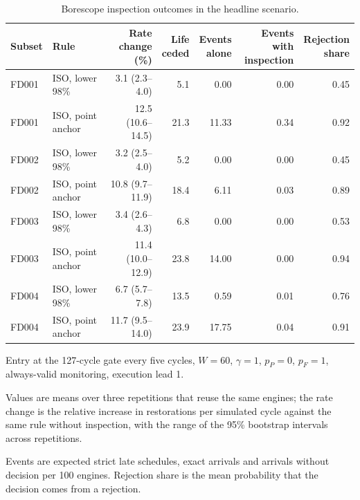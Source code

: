 \documentclass[12pt]{article}
\newcommand{\tablenotes}[1]{\par\smallskip\begin{minipage}{\linewidth}\footnotesize\raggedright\setlength{\parindent}{0pt}#1\end{minipage}}
\begin{document}
\begin{table}[htbp]
\centering
\caption{Borescope inspection outcomes in the headline scenario.}
\label{tab:inspection}
\footnotesize
\setlength{\tabcolsep}{3pt}
\begin{tabularx}{\linewidth}{@{}lXrrrrr@{}}
\toprule
Subset & Rule & \shortstack{Rate change\\(\%)} & \shortstack{Life\\ceded} & \shortstack{Events\\alone} & \shortstack{Events with\\inspection} & \shortstack{Rejection\\share} \\
\midrule
FD001 & ISO, lower 98\% & 3.1 (2.3--4.0) & 5.1 & 0.00 & 0.00 & 0.45 \\
FD001 & ISO, point anchor & 12.5 (10.6--14.5) & 21.3 & 11.33 & 0.34 & 0.92 \\
FD002 & ISO, lower 98\% & 3.2 (2.5--4.0) & 5.2 & 0.00 & 0.00 & 0.45 \\
FD002 & ISO, point anchor & 10.8 (9.7--11.9) & 18.4 & 6.11 & 0.03 & 0.89 \\
FD003 & ISO, lower 98\% & 3.4 (2.6--4.3) & 6.8 & 0.00 & 0.00 & 0.53 \\
FD003 & ISO, point anchor & 11.4 (10.0--12.9) & 23.8 & 14.00 & 0.00 & 0.94 \\
FD004 & ISO, lower 98\% & 6.7 (5.7--7.8) & 13.5 & 0.59 & 0.01 & 0.76 \\
FD004 & ISO, point anchor & 11.7 (9.5--14.0) & 23.9 & 17.75 & 0.04 & 0.91 \\
\bottomrule
\end{tabularx}
\tablenotes{Entry at the 127-cycle gate every five cycles, $W=60$, $\gamma=1$, $p_P=0$, $p_F=1$, always-valid monitoring, execution lead 1.

Values are means over three repetitions that reuse the same engines; the rate change is the relative increase in restorations per simulated cycle against the same rule without inspection, with the range of the 95\% bootstrap intervals across repetitions.

Events are expected strict late schedules, exact arrivals and arrivals without decision per 100 engines. Rejection share is the mean probability that the decision comes from a rejection.}
\end{table}



\end{document}
